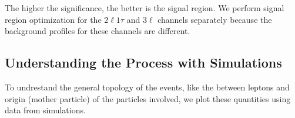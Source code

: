 \documentclass[letterpaper,12pt]{article}
\begin{document}
The higher the significance, the better is the signal region. We perform signal region optimization for the $2\ell1\tau$ and $3\ell$ channels separately because the background profiles for these channels are different.

\subsection{Understanding the Process with Simulations}
\label{sec:gen}

To undrestand the general topology of the events, like the \DeltaR{} between leptons and origin (mother particle) of the particles involved, we plot these quantities using data from simulations.
\vspace{0.7cm}
\begin{figure}[h]
\centering
{}%
\qquad
{}%


\end{figure}
\end{document}
